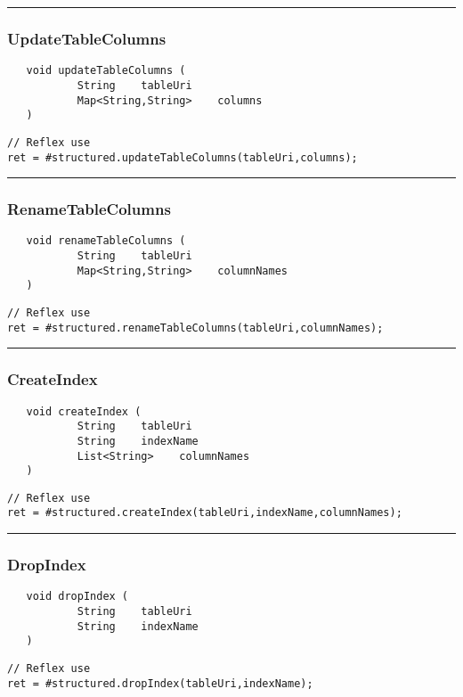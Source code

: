\rule{15cm}{2pt}
\subsubsection{UpdateTableColumns}
\label{Api:UpdateTableColumns}
\begin{verbatim}
   void updateTableColumns (
           String    tableUri
           Map<String,String>    columns
   )
\end{verbatim}
\begin{lstlisting}[language=reflex]
// Reflex use
ret = #structured.updateTableColumns(tableUri,columns);
\end{lstlisting}



\rule{15cm}{2pt}
\subsubsection{RenameTableColumns}
\label{Api:RenameTableColumns}
\begin{verbatim}
   void renameTableColumns (
           String    tableUri
           Map<String,String>    columnNames
   )
\end{verbatim}
\begin{lstlisting}[language=reflex]
// Reflex use
ret = #structured.renameTableColumns(tableUri,columnNames);
\end{lstlisting}



\rule{15cm}{2pt}
\subsubsection{CreateIndex}
\label{Api:CreateIndex}
\begin{verbatim}
   void createIndex (
           String    tableUri
           String    indexName
           List<String>    columnNames
   )
\end{verbatim}
\begin{lstlisting}[language=reflex]
// Reflex use
ret = #structured.createIndex(tableUri,indexName,columnNames);
\end{lstlisting}



\rule{15cm}{2pt}
\subsubsection{DropIndex}
\label{Api:DropIndex}
\begin{verbatim}
   void dropIndex (
           String    tableUri
           String    indexName
   )
\end{verbatim}
\begin{lstlisting}[language=reflex]
// Reflex use
ret = #structured.dropIndex(tableUri,indexName);
\end{lstlisting}



